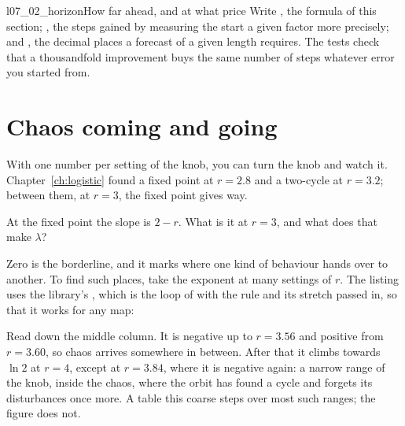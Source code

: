 \begin{lab}{l07_02_horizon}{How far ahead, and at what price}
Write , the formula of this section; , the
steps gained by measuring the start a given factor more precisely; and
, the decimal places a forecast of a given length
requires. The tests check that a thousandfold improvement buys the same
number of steps whatever error you started from.
\end{lab}

\section{Chaos coming and going}
\label{sec:ch07-sweep}

\noindent
With one number per setting of the knob, you can turn the knob and watch
it. Chapter~\ref{ch:logistic} found a fixed point at
$r = \num{2.8}$ and a two-cycle at $r = \num{3.2}$; between them, at $r = 3$,
the fixed point gives way.

\begin{think}
At the fixed point the slope is $2 - r$. What is it at $r = 3$, and what does
that make $\lambda$?
\end{think}
Zero is the borderline, and it marks where one kind of behaviour hands over
to another. To find such places, take the exponent at many settings of $r$.
The listing uses the library's , which is the
loop of  with the rule and its stretch passed in, so that it
works for any map:



\noindent
Read down the middle column. It is negative up to $r = \num{3.56}$ and
positive from $r = \num{3.60}$, so chaos arrives somewhere in between. After
that it climbs towards $\ln 2$ at $r = 4$, except at $r = \num{3.84}$, where
it is negative again: a narrow range of the knob, inside the chaos, where the
orbit has found a cycle and forgets its disturbances once more. A table this
coarse steps over most such ranges; the figure does not.



